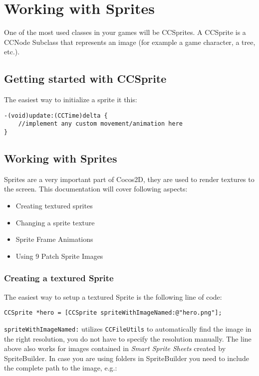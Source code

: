 \chapter{Working with Sprites}
One of the most used classes in your games will be CCSprites. A CCSprite is a
CCNode Subclass that represents an image (for example a game character, a tree,
etc.). 
\section{Getting started with CCSprite}
The easiest way to initialize a sprite it this:
\begin{lstlisting}
-(void)update:(CCTime)delta {
	//implement any custom movement/animation here
}
\end{lstlisting}


\section{Working with Sprites}\label{working-with-sprites}

Sprites are a very important part of Cocos2D, they are used to render
textures to the screen. This documentation will cover following aspects:

\begin{itemize}
\itemsep1pt\parskip0pt
\item
  Creating textured sprites
\item
  Changing a sprite texture
\item
  Sprite Frame Animations
\item
  Using 9 Patch Sprite Images
\end{itemize}

\subsection{Creating a textured
Sprite}\label{creating-a-textured-sprite}

The easiest way to setup a textured Sprite is the following line of
code:

\begin{verbatim}
CCSprite *hero = [CCSprite spriteWithImageNamed:@"hero.png"];
\end{verbatim}

\texttt{spriteWithImageNamed:} utilizes \texttt{CCFileUtils} to
automatically find the image in the right resolution, you do not have to
specify the resolution manually. The line above also works for images
contained in \emph{Smart Sprite Sheets} created by SpriteBuilder. In
case you are using folders in SpriteBuilder you need to include the
complete path to the image, e.g.:

